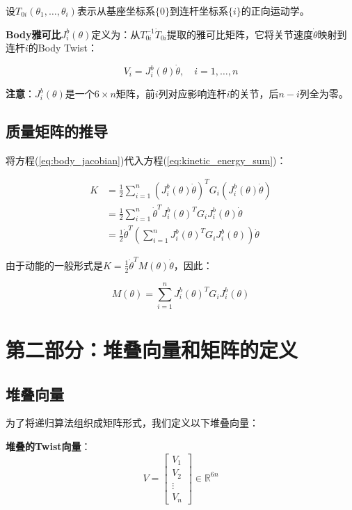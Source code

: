 \documentclass[12pt,a4paper]{article}
\begin{document}
设$T_{0i}(\theta_1, \ldots, \theta_i)$表示从基座坐标系$\{0\}$到连杆坐标系$\{i\}$的正向运动学。

\textbf{Body雅可比}$J_i^b(\theta)$定义为：从$T_{0i}^{-1}\dot{T}_{0i}$提取的雅可比矩阵，它将关节速度$\dot{\theta}$映射到连杆$i$的Body Twist：

\begin{equation}
V_i = J_i^b(\theta) \dot{\theta}, \quad i = 1, \ldots, n
\label{eq:body_jacobian}
\end{equation}

\textbf{注意}：$J_i^b(\theta)$是一个$6 \times n$矩阵，前$i$列对应影响连杆$i$的关节，后$n-i$列全为零。

\subsection{质量矩阵的推导}

将方程(\ref{eq:body_jacobian})代入方程(\ref{eq:kinetic_energy_sum})：

\begin{align}
K &= \frac{1}{2}\sum_{i=1}^{n} (J_i^b(\theta) \dot{\theta})^T G_i (J_i^b(\theta) \dot{\theta}) \\
&= \frac{1}{2}\sum_{i=1}^{n} \dot{\theta}^T J_i^b(\theta)^T G_i J_i^b(\theta) \dot{\theta} \\
&= \frac{1}{2}\dot{\theta}^T \left(\sum_{i=1}^{n} J_i^b(\theta)^T G_i J_i^b(\theta)\right) \dot{\theta}
\end{align}

由于动能的一般形式是$K = \frac{1}{2}\dot{\theta}^T M(\theta) \dot{\theta}$，因此：

\begin{equation}
M(\theta) = \sum_{i=1}^{n} J_i^b(\theta)^T G_i J_i^b(\theta)
\label{eq:mass_matrix}
\end{equation}

\section{第二部分：堆叠向量和矩阵的定义}

\subsection{堆叠向量}

为了将递归算法组织成矩阵形式，我们定义以下堆叠向量：

\textbf{堆叠的Twist向量}：
\begin{equation}
V = \begin{bmatrix} V_1 \\ V_2 \\ \vdots \\ V_n \end{bmatrix} \in \mathbb{R}^{6n}
\label{eq:stacked_V}
\end{equation}
\end{document}
